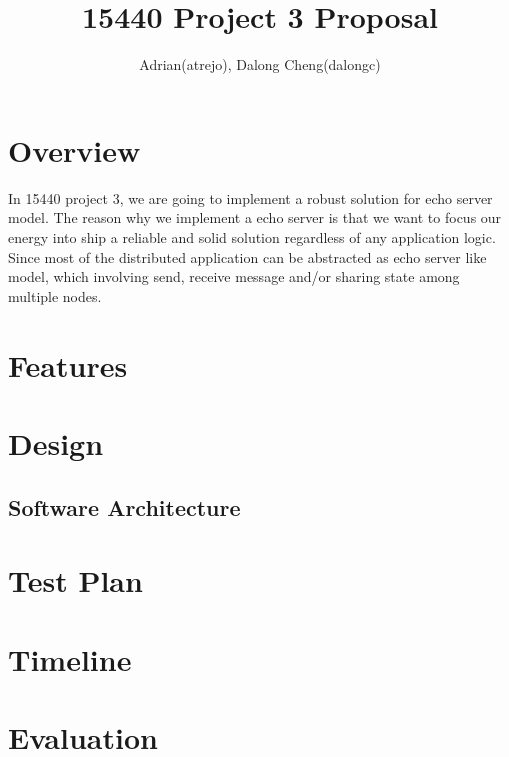 \documentclass[12pt,twoside]{article}
\title{\textbf{\doctitle}\\
15440 Project 3 Proposal}
\author{Adrian(atrejo), Dalong Cheng(dalongc)}
\begin{document}
\thispagestyle{empty}

\maketitle

\section{Overview}
In 15440 project 3, we are going to implement a robust solution for
echo server model. The reason why we implement a echo server is that
we want to focus our energy into ship a reliable and solid solution
regardless of any application logic. Since most of the distributed
application can be abstracted as echo server like model, which involving
send, receive message and/or sharing state among multiple nodes.

\section{Features}

\section{Design}
\subsection{Software Architecture}
\section{Test Plan}

\section{Timeline}

\section{Evaluation}



\end{document}
